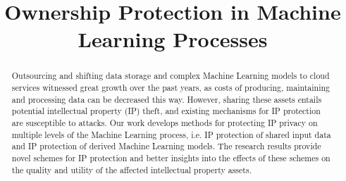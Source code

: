 \documentclass[conference]{IEEEtran}
\begin{document}
\title{Ownership Protection in Machine Learning Processes}

\author{
}

\maketitle

\begin{abstract}
Outsourcing and shifting data storage and complex Machine Learning models to cloud services witnessed great growth over the past years, as costs of producing, maintaining and processing data can be decreased this way. 
However, sharing
these assets entails potential intellectual property (IP) theft, and existing mechanisms for IP protection are susceptible to attacks. 
Our work develops methods for protecting IP privacy on multiple levels of the Machine Learning process, i.e. IP protection of shared input data and IP protection of derived Machine Learning models. 
The research results provide novel schemes for IP protection and better insights into the effects of these schemes on the quality and utility of the affected intellectual property assets.
\end{abstract}
\end{document}
